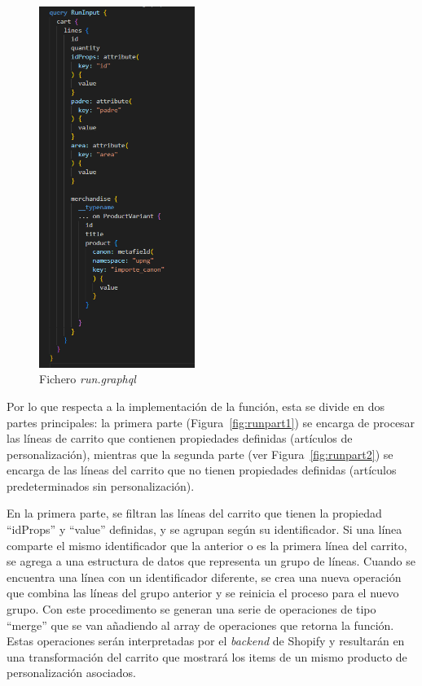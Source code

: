 \documentclass[11pt]{article}
\begin{document}
\begin{figure}[H]
    \centering
    \includegraphics[width=0.45\textwidth]{imagenes-tema/queryCartTransform.png}
    \caption{\label{fig:queryCart} Fichero \textit{run.graphql}}
    \vspace{\fill}
\end{figure}

Por lo que respecta a la implementación de la función, esta se divide en dos partes principales: la primera parte (Figura~\ref{fig:runpart1})  se encarga de procesar las líneas de carrito que contienen
propiedades definidas (artículos de personalización), mientras que la segunda parte (ver Figura~\ref{fig:runpart2}) se encarga de las líneas del carrito que no tienen propiedades definidas (artículos predeterminados sin personalización).

En la primera parte, se filtran las líneas del carrito que tienen la propiedad ``idProps'' y ``value'' definidas, y se agrupan según su identificador. Si una línea comparte el mismo identificador que la anterior
o es la primera línea del carrito, se agrega a una estructura de datos que representa un grupo de líneas. Cuando se encuentra una línea con un identificador diferente, se crea una nueva operación 
que combina las líneas del grupo anterior y se reinicia el proceso para el nuevo grupo. Con este procedimento se generan una serie de operaciones de tipo ``merge'' que se van añadiendo al array de operaciones que retorna 
la función. Estas operaciones serán interpretadas por el \textit{backend} de Shopify y resultarán en una transformación del carrito que mostrará los items de un mismo producto de personalización asociados.
\end{document}
